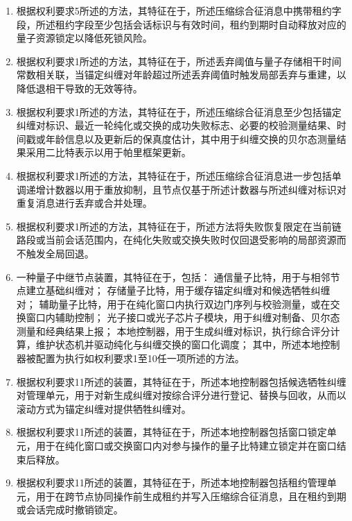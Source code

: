 \documentclass[12pt,a4paper]{article}
\begin{document}
\begin{enumerate}[label=\arabic*.,leftmargin=2em,itemsep=0.6em]
    \item 根据权利要求5所述的方法，其特征在于，所述压缩综合征消息中携带租约字段，所述租约字段至少包括会话标识与有效时间，租约到期时自动释放对应的量子资源锁定以降低死锁风险。

    \item 根据权利要求1所述的方法，其特征在于，所述丢弃阈值与量子存储相干时间常数相关联，当锚定纠缠对年龄超过所述丢弃阈值时触发局部丢弃与重建，以降低退相干导致的无效等待。

    \item 根据权利要求1所述的方法，其特征在于，所述压缩综合征消息至少包括锚定纠缠对标识、最近一轮纯化或交换的成功失败标志、必要的校验测量结果、时间戳或年龄信息以及更新后的保真度估计，其中用于纠缠交换的贝尔态测量结果采用二比特表示以用于帕里框架更新。

    \item 根据权利要求1所述的方法，其特征在于，所述压缩综合征消息进一步包括单调递增计数器以用于重放抑制，且节点仅基于所述计数器与所述纠缠对标识对重复消息进行丢弃或合并处理。

    \item 根据权利要求1所述的方法，其特征在于，所述方法将失败恢复限定在当前链路段或当前会话范围内，在纯化失败或交换失败时仅回退受影响的局部资源而不触发全局回退。

    \item 一种量子中继节点装置，其特征在于，包括：
    通信量子比特，用于与相邻节点建立基础纠缠对；
    存储量子比特，用于缓存锚定纠缠对和候选牺牲纠缠对；
    辅助量子比特，用于在纯化窗口内执行双边门序列与校验测量，或在交换窗口内辅助控制；
    光子接口或光子芯片子模块，用于纠缠对制备、贝尔态测量和经典结果上报；
    本地控制器，用于生成纠缠对标识，执行综合评分计算，维护状态机并驱动纯化与纠缠交换的窗口化调度；
    其中，所述本地控制器被配置为执行如权利要求1至10任一项所述的方法。

    \item 根据权利要求11所述的装置，其特征在于，所述本地控制器包括候选牺牲纠缠对管理单元，用于对新生成纠缠对按综合评分进行登记、替换与回收，从而以滚动方式为锚定纠缠对提供牺牲纠缠对。

    \item 根据权利要求11所述的装置，其特征在于，所述本地控制器包括窗口锁定单元，用于在纯化窗口或交换窗口内对参与操作的量子比特建立锁定并在窗口结束后释放。

    \item 根据权利要求11所述的装置，其特征在于，所述本地控制器包括租约管理单元，用于在跨节点协同操作前生成租约并写入压缩综合征消息，且在租约到期或会话完成时撤销锁定。


\end{enumerate}
\end{document}
